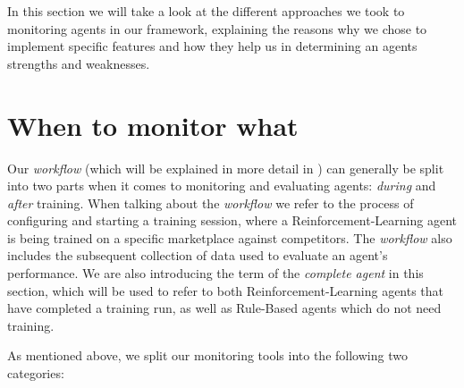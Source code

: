\begin{jointwork}\label{ch:Approaches}
	In this section we will take a look at the different approaches we took to monitoring agents in our framework, explaining the reasons why we chose to implement specific features and how they help us in determining an agents strengths and weaknesses.
\end{jointwork}

\section{When to monitor what}\label{sec:WhenToMonitorWhat}

Our \emph{workflow} (which will be explained in more detail in ) can generally be split into two parts when it comes to monitoring and evaluating agents: \emph{during} and \emph{after} training. When talking about the \emph{workflow} we refer to the process of configuring and starting a training session, where a Reinforcement-Learning agent is being trained on a specific marketplace against competitors. The \emph{workflow} also includes the subsequent collection of data used to evaluate an agent's performance. We are also introducing the term of the \emph{complete agent} in this section, which will be used to refer to both Reinforcement-Learning agents that have completed a training run, as well as Rule-Based agents which do not need training.

As mentioned above, we split our monitoring tools into the following two categories:

